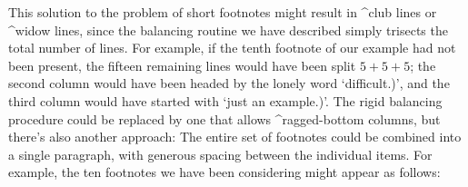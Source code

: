 {%
This solution to the problem of short footnotes might result in
^{club lines} or ^{widow lines}, since the balancing routine we have
described simply trisects the total number of lines. For example,
if the tenth footnote of our example had not been present,
the fifteen remaining lines would have been split $5+5+5$;
the second column would have been headed by the lonely
word `{\eightrm difficult.)}', and the third column would have
started with `{\eightrm just an example.)}'. The rigid balancing
procedure could be replaced by one that allows ^{ragged-bottom}
columns, but there's also another approach: The entire set of footnotes
could be combined into a single paragraph, with generous spacing
between the individual items. For example, the ten footnotes we
have been considering might appear as follows:
}
